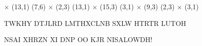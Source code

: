 \documentclass{puzzlehunt}
\begin{document}
   \(\times\) (13,1)
  \hspace*{\fill}
  (7,6) \(\times\) (2,3)
  \hspace*{\fill}
  (13,1) \(\times\) (15,3)
  \hspace*{\fill}
  (3,1) \(\times\) (9,3)
  \hspace*{\fill}
  (2,3) \(\times\) (3,1)

\vfill\vfill







  \vfill


  {\LARGE
  TWKHY DTJLRD LMTHXCLNB SXLW HTRTR LUTOH

  \vspace{4em}

  \noindent NSAI XHRZN XI DNP OO KJR NISALOWDH!
  }


  \vfill\vfill










  \newcommand{\escapePodTournamentSquare}{%
    \begin{tikzpicture}\draw (0,0) circle [radius=0.6em];\end{tikzpicture}%
  }
  \newcommand{\escapePodTournament}[8]{
    \begin{tabular}{c}
    \begin{tikzpicture}
      \tikzset{edge from parent/.style=
      {draw,
      edge from parent path={(\tikzparentnode.south)
      -- +(0,-8pt)
      -| (\tikzchildnode)}}}
    \Tree
      [.\escapePodTournamentSquare{}
        [.\escapePodTournamentSquare{}
          [.\escapePodTournamentSquare{}
            #1
            #2
          ]
          [.\escapePodTournamentSquare{}
            #3
            #4
          ]
        ]
        [.\escapePodTournamentSquare{}
          [.\escapePodTournamentSquare{}
            #5
            #6
          ]
          #7
        ]
      ]
    \end{tikzpicture} \\
    \textbf{#8} \vspace{1em}
    \end{tabular}
  }
\end{document}
